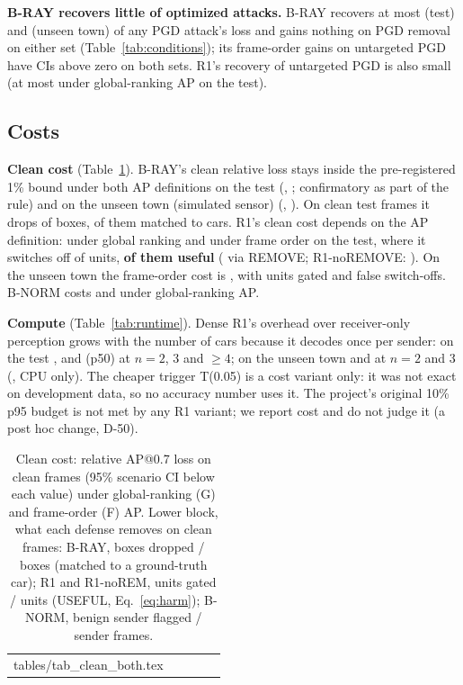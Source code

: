 \documentclass[conference]{IEEEtran}
\makeatletter
\newcommand{\Cul}{unseen town (simulated sensor)}
\newcommand{\tabin}[1]{\@@input #1 }
\makeatother
\begin{document}
\textbf{B-RAY recovers little of optimized attacks.} B-RAY recovers at most \RecFramePgdUntStStrongBRAY{} (test)
and \CulRecFramePgdUntBRAY{} (unseen town) of any PGD attack's loss and gains nothing on PGD removal on either set
(Table~\ref{tab:conditions}); its frame-order gains on untargeted PGD have CIs above zero on both sets. R1's
recovery of untargeted PGD is also small (at most \RecGlobPgdUntStRONE{} under global-ranking AP on the test).

\subsection{Costs}
\label{sec:costs}
\textbf{Clean cost} (Table~\ref{tab:clean}). B-RAY's clean relative loss stays inside the pre-registered 1\%
bound under both AP definitions on the test (\CleanGlobBRAY, \CleanFrameBRAY; confirmatory as part of the rule)
and on the \Cul{} (\CulCleanGlobBRAY, \CulCleanFrameBRAY). On clean test frames it drops \BrayCleanDrop{} of
\BrayCleanBoxes{} boxes, \BrayCleanDropGT{} of them matched to cars. R1's clean cost depends on the AP definition:
\CleanGlobRONE{} under global ranking and \CleanFrameRONE{} \CleanFrameRONECI{} under frame order on the test, where
it switches off \RoneCleanGated{} of \RoneCleanUnits{} units, \textbf{\RoneCleanFalseSwitch{} of them useful}
(\RoneCleanFalseSwitchRemove{} via REMOVE; R1-noREMOVE: \RNoRemCleanFalseSwitch). On the unseen town the
frame-order cost is \CulCleanFrameRONE{} \CulCleanFrameRONECI, with \CulRoneCleanGated{} units gated and
\CulRoneCleanFalseSwitch{} false switch-offs. B-NORM costs \CleanGlobBNORM{} and \CulCleanGlobBNORM{} under
global-ranking AP.

\textbf{Compute} (Table~\ref{tab:runtime}). Dense R1's overhead over receiver-only perception grows with the
number of cars because it decodes once per sender: on the test \OvDenseTwoPfifty, \OvDenseThreePfifty{} and
\OvDenseFourPlusPfifty{} (p50) at $n=2$, 3 and ${\ge}4$; on the unseen town \CulOvDenseTwoPfifty{} and
\CulOvDenseThreePfifty{} at $n=2$ and 3 (\TimingMachine, CPU only). The cheaper trigger T(0.05) is a cost
variant only: it was not exact on development data, so no accuracy number uses it. The project's original 10\%
p95 budget is not met by any R1 variant; we report cost and do not judge it (a post hoc change, D-50).

\begin{table}[!t]
\caption{Clean cost: relative AP@0.7 loss on clean frames (95\% scenario CI below each value) under
global-ranking (G) and frame-order (F) AP. Lower block, what each defense removes on clean frames: B-RAY, boxes
dropped / boxes (matched to a ground-truth car); R1 and R1-noREM, units gated / units (USEFUL, Eq.~\eqref{eq:harm});
B-NORM, benign sender flagged / sender frames.}
\label{tab:clean}
\centering
\scriptsize
\setlength{\tabcolsep}{3.5pt}
\begin{tabular}{@{}lcccc@{}}
\toprule
\tabin{tables/tab_clean_both.tex}
\bottomrule
\end{tabular}
\end{table}
\end{document}
